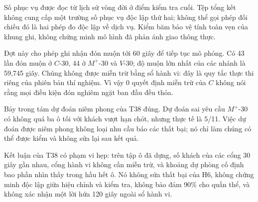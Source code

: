 Số phục vụ được đọc từ lịch sử vòng đời ở điểm kiểm tra cuối. Tệp tổng kết
không cung cấp một trường số phục vụ độc lập thứ hai; không thể gọi phép
đối chiếu đó là hai phép đo độc lập về dịch vụ. Kiểm băm bảo vệ tính toàn
vẹn của khung ghi, không chứng minh mô hình đã phản ánh giao thông thực.

Đợt này cho phép ghi nhận đón muộn tới 60 giây để tiếp tục mô phỏng. Có 43
lần đón muộn ở $C$-30, 44 ở $M^{+}$-30 và $V$-30; độ muộn lớn nhất của
các nhánh là 59,745 giây. Chúng không được miễn trừ bằng sổ hành vi: đây là
quy tắc thực thi riêng của phiên bản thí nghiệm. Vì vậy 0 quyết định miễn
trừ của $C$ không nói rằng mọi điều kiện đón nghiêm ngặt ban đầu đều thỏa.

Bảy trong tám dự đoán niêm phong của T38 đúng. Dự đoán sai yêu cầu
$M^{+}$-30 có không quá ba ô tối với khách vượt hạn chót, nhưng thực tế là
5/11. Việc dự đoán được niêm phong không loại nhu cầu báo các thất bại;
nó chỉ làm chúng có thể được kiểm và không sửa lại sau kết quả.

Kết luận của T38 có phạm vi hẹp: trên tập ô đã dựng, số khách của các cổng
30 giây gần nhau, cổng hành vi không cần miễn trừ, và khoảng dự phòng cố
định bao phần nhìn thấy trong hầu hết ô. Nó không sửa thất bại của H6,
không chứng minh độc lập giữa hiệu chỉnh và kiểm tra, không bảo đảm 90\%
cho quần thể, và không xác nhận một lời hứa 120 giây ngoài sổ hành vi.
